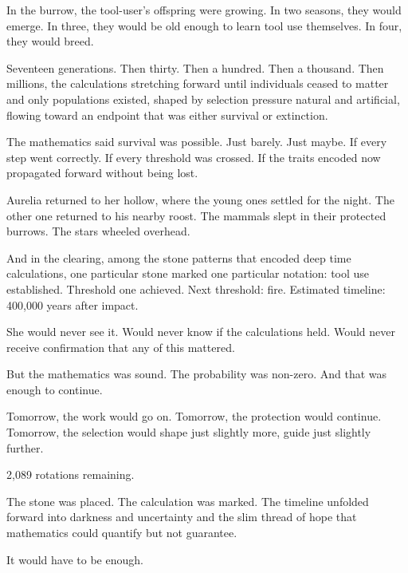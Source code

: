 In the burrow, the tool-user's offspring were growing. In two seasons, they would emerge. In three, they would be old enough to learn tool use themselves. In four, they would breed.

Seventeen generations. Then thirty. Then a hundred. Then a thousand. Then millions, the calculations stretching forward until individuals ceased to matter and only populations existed, shaped by selection pressure natural and artificial, flowing toward an endpoint that was either survival or extinction.

The mathematics said survival was possible. Just barely. Just maybe. If every step went correctly. If every threshold was crossed. If the traits encoded now propagated forward without being lost.

Aurelia returned to her hollow, where the young ones settled for the night. The other one returned to his nearby roost. The mammals slept in their protected burrows. The stars wheeled overhead.

And in the clearing, among the stone patterns that encoded deep time calculations, one particular stone marked one particular notation: tool use established. Threshold one achieved. Next threshold: fire. Estimated timeline: 400,000 years after impact.

She would never see it. Would never know if the calculations held. Would never receive confirmation that any of this mattered.

But the mathematics was sound. The probability was non-zero. And that was enough to continue.

Tomorrow, the work would go on. Tomorrow, the protection would continue. Tomorrow, the selection would shape just slightly more, guide just slightly further.

2,089 rotations remaining.

The stone was placed. The calculation was marked. The timeline unfolded forward into darkness and uncertainty and the slim thread of hope that mathematics could quantify but not guarantee.

It would have to be enough.

